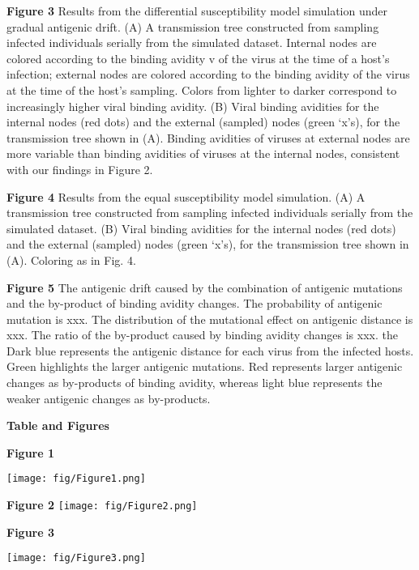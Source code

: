 \documentclass[12pt,a4paper]{article}
\begin{document}
{\bf Figure 3} Results from the differential susceptibility model simulation under gradual antigenic drift. (A) A transmission tree constructed from sampling infected individuals serially from the simulated dataset. Internal nodes are colored according to the binding avidity v of the virus at the time of a host’s infection; external nodes are colored according to the binding avidity of the virus at the time of the host’s sampling. Colors from lighter to darker correspond to increasingly higher viral binding avidity. (B) Viral binding avidities for the internal nodes (red dots) and the external (sampled) nodes (green ‘x’s), for the transmission tree shown in (A). Binding avidities of viruses at external nodes are more variable than binding avidities of viruses at the internal nodes, consistent with our findings in Figure 2.  

{\bf Figure 4} Results from the equal susceptibility model simulation. (A) A transmission tree constructed from sampling infected individuals serially from the simulated dataset. (B) Viral binding avidities for the internal nodes (red dots) and the external (sampled) nodes (green ‘x’s), for the transmission tree shown in (A). Coloring as in Fig. 4.
 
{\bf Figure 5} The antigenic drift caused by the combination of antigenic mutations and the by-product of binding avidity changes. The probability of antigenic mutation is xxx. The distribution of the mutational effect on antigenic distance is xxx. The ratio of the by-product caused by binding avidity changes is xxx. the Dark blue represents the antigenic distance for each virus from the infected hosts. Green highlights the larger antigenic mutations. Red represents larger antigenic changes as by-products of binding avidity, whereas light blue represents the weaker antigenic changes as by-products.  





\clearpage

{\bf Table and Figures}

\clearpage

{\bf Figure 1}

\texttt{[image: fig/Figure1.png]}

\clearpage

{\bf Figure 2}
\texttt{[image: fig/Figure2.png]}
\clearpage

{\bf Figure 3}

\texttt{[image: fig/Figure3.png]}
\end{document}
